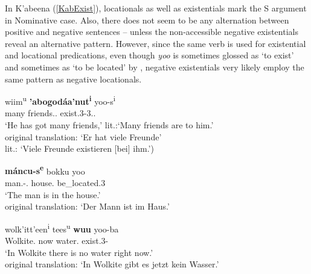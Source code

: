 

In K'abeena (\ref{KabExist}), locationals as well as existentials  mark the S argument in Nominative case.
Also, there does not seem to be any alternation between positive and negative sentences -- unless the non-accessible negative existentials reveal an alternative pattern. 
However, since the same verb is used for existential and locational predications, even though \emph{yoo} is sometimes glossed as `to exist' and sometimes as `to be located' by \citet{Crass:2005}, negative existentials very likely employ the same pattern as negative locationals. 
 
\begin{exe}\ex\label{KabExist}
\begin{xlist}
\ex\gll wiim\textsuperscript{u} \textbf{'abogod\'aa'nut\textsuperscript{i}} yoo-s\textsuperscript{i}\\
many friends.\nom{}.\pl{} exist.3-3\sg{}.\mas{}.\obj{}\\
\glt `He has got many friends,' lit.:`Many friends are to him.'\\ 
original translation: `Er hat viele Freunde'\\
lit.: `Viele Freunde exis\-tie\-ren [bei] ihm.')

\ex\gll \textbf{m\'ancu-s\textsuperscript{e}} bokku yoo\\
man.\nom{}-.\mas{} house.\acc{} be\_located.3\\
\glt `The man is in the house.' \\
original translation: `Der Mann ist im Haus.'

\ex\gll wolk'itt'een\textsuperscript{i} tees\textsuperscript{u} \textbf{wuu} yoo-ba\\
Wolkite.\loc{} now water.\nom{} exist.3-\Neg{}\\
\glt `In Wolkite there is no water right now.'\\ 
original translation: `In Wolkite gibt es jetzt kein Wasser.'
\end{xlist}
\end{exe}

